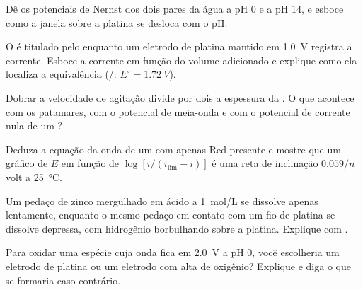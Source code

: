 \begin{exercise}[$\star\star$]\label{exo:b2:current-potential-curves:7}
Dê os potenciais de Nernst dos dois pares da água a pH 0 e a pH 14, e
esboce como a janela sobre a platina se desloca com o pH.
\end{exercise}

\begin{exercise}[$\star\star$]\label{exo:b2:current-potential-curves:8}
O  é titulado pelo  enquanto um eletrodo de platina
mantido em \qty{1.0}{V} registra a corrente. Esboce a corrente em função do
volume adicionado e explique como ela localiza a equivalência (/: $E^\circ =
\qty{1.72}{V}$).
\end{exercise}

\begin{exercise}[$\star\star$]\label{exo:b2:current-potential-curves:9}
Dobrar a velocidade de agitação divide por dois a espessura da . O que acontece com os patamares, com o potencial de meia-onda e com
o potencial de corrente nula de um ?
\end{exercise}

\begin{exercise}[$\star\star\star$]\label{exo:b2:current-potential-curves:10}
Deduza a equação da onda de um  com apenas Red presente e
mostre que um gráfico de $E$ em função de $\log[i/(i_{\lim} - i)]$ é uma reta
de inclinação $0.059/n$ volt a \qty{25}{\degreeCelsius}.
\end{exercise}

\begin{exercise}[$\star\star\star$]\label{exo:b2:current-potential-curves:11}
Um pedaço de zinco mergulhado em ácido a \qty{1}{mol/L} se dissolve apenas
lentamente, enquanto o mesmo pedaço em contato com um fio de platina se
dissolve depressa, com hidrogênio borbulhando sobre a platina. Explique com
.
\end{exercise}

\begin{exercise}[$\star\star\star$]\label{exo:b2:current-potential-curves:12}
Para oxidar uma espécie cuja onda fica em \qty{2.0}{V} a pH 0, você escolheria
um eletrodo de platina ou um eletrodo com alta  de oxigênio?
Explique e diga o que se formaria caso contrário.
\end{exercise}

